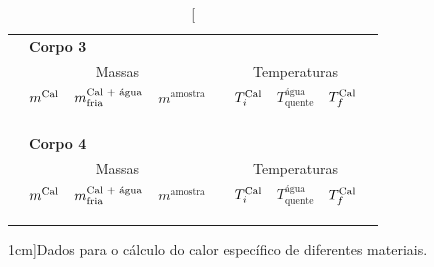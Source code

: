 \begin{table}[!ht]
\begin{tabular}{lp{22mm}p{22mm}p{22mm}lp{22mm}p{22mm}p{22mm}l}
		&\multicolumn{6}{l}{\textbf{Corpo 3}}\\
		\cmidrule{2-8}
		&\multicolumn{3}{c}{Massas} & & \multicolumn{3}{c}{Temperaturas}& \\
		\cmidrule{2-4}\cmidrule{6-8}
		& $m^{\rm{Cal}}$ & $m^{\textrm{Cal + água}}_{\rm{fria}}$ & $m^{\textrm{amostra}}$ & & $T^{\rm{Cal}}_{i}$ & $T^{\textrm{água}}_{\textrm{quente}}$ & $T^{\rm{Cal}}_{f}$ & \\
		\cmidrule{2-4}\cmidrule{6-8}
		& \cellcolor[gray]{0.95} & \cellcolor[gray]{0.97} & \cellcolor[gray]{0.95} & & \cellcolor[gray]{0.95} & \cellcolor[gray]{0.97} & \cellcolor[gray]{0.95} & \\
		& \cellcolor[gray]{0.89} & \cellcolor[gray]{0.92} & \cellcolor[gray]{0.89} & & \cellcolor[gray]{0.89} & \cellcolor[gray]{0.92} & \cellcolor[gray]{0.89} & \\
		& \cellcolor[gray]{0.95} & \cellcolor[gray]{0.97} & \cellcolor[gray]{0.95} & & \cellcolor[gray]{0.95} & \cellcolor[gray]{0.97} & \cellcolor[gray]{0.95} & \\
		\cmidrule{2-8}
\\
		&\multicolumn{6}{l}{\textbf{Corpo 4}}\\
		\cmidrule{2-8}
		&\multicolumn{3}{c}{Massas} & & \multicolumn{3}{c}{Temperaturas}& \\
		\cmidrule{2-4}\cmidrule{6-8}
		& $m^{\rm{Cal}}$ & $m^{\textrm{Cal + água}}_{\rm{fria}}$ & $m^{\textrm{amostra}}$ & & $T^{\rm{Cal}}_{i}$ & $T^{\textrm{água}}_{\textrm{quente}}$ & $T^{\rm{Cal}}_{f}$ & \\
		\cmidrule{2-4}\cmidrule{6-8}
		& \cellcolor[gray]{0.95} & \cellcolor[gray]{0.97} & \cellcolor[gray]{0.95} & & \cellcolor[gray]{0.95} & \cellcolor[gray]{0.97} & \cellcolor[gray]{0.95} & \\
		& \cellcolor[gray]{0.89} & \cellcolor[gray]{0.92} & \cellcolor[gray]{0.89} & & \cellcolor[gray]{0.89} & \cellcolor[gray]{0.92} & \cellcolor[gray]{0.89} & \\
		& \cellcolor[gray]{0.95} & \cellcolor[gray]{0.97} & \cellcolor[gray]{0.95} & & \cellcolor[gray]{0.95} & \cellcolor[gray]{0.97} & \cellcolor[gray]{0.95} & \\
		\cmidrule{2-8}
		\bottomrule
	\end{tabular}
	\caption[][1cm]{Dados para o cálculo do calor específico de diferentes materiais.}
	\label{Tab:CalorEspecifico}
\end{table}

\vfill


